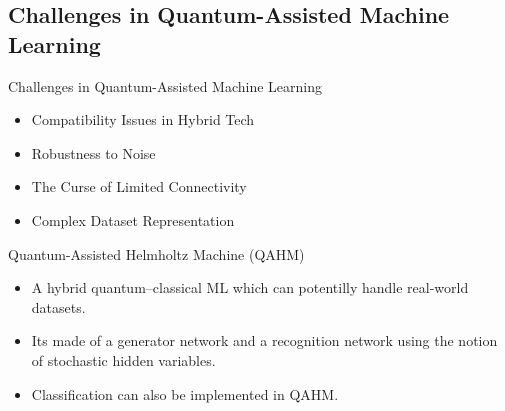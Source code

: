 \documentclass[aspectratio=169, handout]{beamer}
\theoremstyle{example}
\begin{document}
\subsection{Challenges in Quantum-Assisted Machine Learning}
\begin{frame}{Challenges in Quantum-Assisted Machine Learning}
  \begin{itemize}
  \pause\item {Compatibility Issues in Hybrid Tech
  }
  \pause\item {Robustness to Noise
  }
  \pause\item {The Curse of Limited Connectivity
  }
  \pause\item {Complex Dataset Representation
  }
  \end{itemize}
\end{frame}
\begin{frame}{Quantum-Assisted Helmholtz Machine (QAHM)}
  \begin{itemize}
  \pause\item {
    A hybrid quantum–classical ML which can potentilly handle real-world datasets.
  }
  \pause\item {
    Its made of a  generator network and a recognition network using the notion of stochastic hidden variables. 
  }
  \pause\item {
   Classification can also be implemented in QAHM.
  }
  \end{itemize}
\end{frame}
\end{document}
